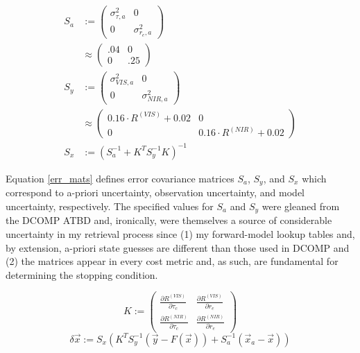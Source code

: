 \documentclass[12pt]{article}
\begin{document}
\begin{equation}\label{err_mats}
    \begin{split}
        S_a &:= \begin{pmatrix}\sigma^2_{\tau, a} & 0 \\ 0 & \sigma^2_{r_e, a}\end{pmatrix} \\
            & \approx \begin{pmatrix} .04 & 0 \\ 0 & .25\end{pmatrix} \\
        S_y &:= \begin{pmatrix}\sigma^2_{VIS, a} & 0 \\ 0 & \sigma^2_{NIR, a}\end{pmatrix} \\
            &\approx \begin{pmatrix} 0.16\cdot R^{(VIS)}+0.02 & 0 \\ 0 & 0.16\cdot R^{(NIR)}+0.02\end{pmatrix} \\
        S_x &:= \left(S_a^{-1} + K^TS_y^{-1}K\right)^{-1}
    \end{split}
\end{equation}

Equation \ref{err_mats} defines error covariance matrices $S_a$, $S_y$, and $S_x$ which correspond to a-priori uncertainty, observation uncertainty, and model uncertainty, respectively. The specified values for $S_a$ and $S_y$ were gleaned from the DCOMP ATBD and, ironically, were themselves a source of considerable uncertainty in my retrieval process since (1) my forward-model lookup tables and, by extension, a-priori state guesses are different than those used in DCOMP and (2) the matrices appear in every cost metric and, as such, are fundamental for determining the stopping condition.

\begin{equation}\label{jac}
        K := \begin{pmatrix} \frac{\partial R^{(VIS)}}{\partial \tau_c} & \frac{\partial R^{(VIS)}}{\partial r_e} \\ \frac{\partial R^{(NIR)}}{\partial \tau_c} & \frac{\partial R^{(NIR)}}{\partial r_e} \end{pmatrix}
\end{equation}
\begin{equation}\label{del}
        \delta \vec{x} := S_x\left(K^T S_y^{-1} (\vec{y}-F(\vec{x})) + S_a^{-1}(\vec{x}_a-\vec{x})\right)
\end{equation}
\end{document}

